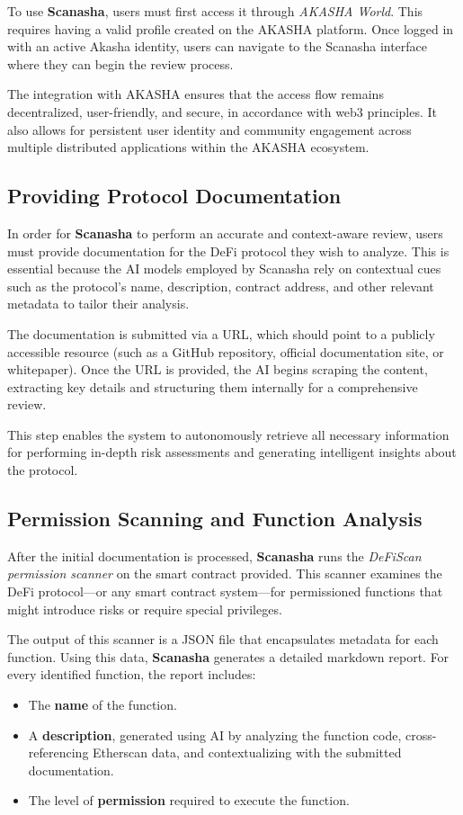 \documentclass[paper=a4, fontsize=11pt,twoside]{scrartcl}
\begin{document}
	To use \textbf{Scanasha}, users must first access it through \textit{AKASHA World}. This requires having a valid profile created on the AKASHA platform. Once logged in with an active Akasha identity, users can navigate to the Scanasha interface where they can begin the review process.

	The integration with AKASHA ensures that the access flow remains decentralized, user-friendly, and secure, in accordance with web3 principles. It also allows for persistent user identity and community engagement across multiple distributed applications within the AKASHA ecosystem.

	\subsection{Providing Protocol Documentation}

	In order for \textbf{Scanasha} to perform an accurate and context-aware review, users must provide documentation for the DeFi protocol they wish to analyze. This is essential because the AI models employed by Scanasha rely on contextual cues such as the protocol's name, description, contract address, and other relevant metadata to tailor their analysis.

	The documentation is submitted via a URL, which should point to a publicly accessible resource (such as a GitHub repository, official documentation site, or whitepaper). Once the URL is provided, the AI begins scraping the content, extracting key details and structuring them internally for a comprehensive review.

	This step enables the system to autonomously retrieve all necessary information for performing in-depth risk assessments and generating intelligent insights about the protocol.

	\subsection{Permission Scanning and Function Analysis}

	After the initial documentation is processed, \textbf{Scanasha} runs the \textit{DeFiScan permission scanner} on the smart contract provided. This scanner examines the DeFi protocol—or any smart contract system—for permissioned functions that might introduce risks or require special privileges.

	The output of this scanner is a JSON file that encapsulates metadata for each function. Using this data, \textbf{Scanasha} generates a detailed markdown report. For every identified function, the report includes:
	\begin{itemize}
		\item The \textbf{name} of the function.
		\item A \textbf{description}, generated using AI by analyzing the function code, cross-referencing Etherscan data, and contextualizing with the submitted documentation.
		\item The level of \textbf{permission} required to execute the function.
	\end{itemize}
\end{document}
